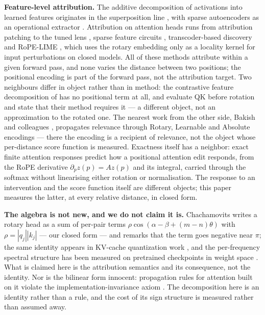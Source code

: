 \documentclass{article}
\theoremstyle{plain}
\theoremstyle{remark}
\begin{document}
\textbf{Feature-level attribution.} The additive decomposition of activations
into learned features originates in the superposition line
\citep{elhage2022toymodels}, with sparse autoencoders as an operational extractor
\citep{cunningham2023sparseautoencoders}. Attribution on attention heads runs
from attribution patching \citep{syed2023attributionpatching} to the tuned lens
\citep{belrose2023tunedlens}, sparse feature circuits
\citep{marks2024sparsefeaturecircuits}, transcoder-based discovery
\citep{dunefsky2024transcoders} and RoPE-LIME
\citep{picov2026ropelime}, which uses the rotary embedding only as a
locality kernel for input perturbations on closed models. All of these methods
attribute within a given forward pass, and none varies the distance between
two positions; the positional encoding is part of the forward pass, not the
attribution target. Two neighbours differ in object rather than in method: the
contrastive feature decomposition of \citet{lee2026contrastive} has no
positional term at all, and \citet{tulchinskii2024listening} evaluate QK before
rotation and state that their method requires it --- a different object, not an
approximation to the rotated one. The nearest work from the other side, Bakish and
colleagues \citep{bakish2025positionallrp}, propagates relevance through
Rotary, Learnable and Absolute encodings --- there the encoding is a
recipient of relevance, not the object whose per-distance score function
is measured. Exactness itself has a neighbor: exact finite attention
responses \citep{huang2026exactfinite} predict how a positional attention
edit responds, from the RoPE derivative $\partial_p z(p) = A z(p)$ and its
integral, carried through the softmax without linearising either rotation
or normalisation. The response to an intervention and the score function
itself are different objects; this paper measures the latter, at every
relative distance, in closed form.

\textbf{The algebra is not new, and we do not claim it is.} Chachamovits
\citep{chachamovits2026phase} writes a rotary head as a sum of per-pair terms
$\rho\cos(\alpha - \beta + (m-n)\theta)$ with $\rho = |q_j||k_j|$ ---
our closed form --- and remarks that the term goes negative near $\pi$; the
same identity appears in KV-cache quantization work \citep{liang2026roaware}, and
the per-frequency spectral structure has been measured on pretrained
checkpoints in weight space \citep{li2026fingerprint}. What is claimed here is
the attribution semantics and its consequence, not the identity. Nor is
the bilinear form innocent: propagation rules for attention built on it
violate the implementation-invariance axiom \citep{you2025lrploo}. The
decomposition here is an identity rather than a rule, and the cost of
its sign structure is measured rather than assumed away.
\end{document}
